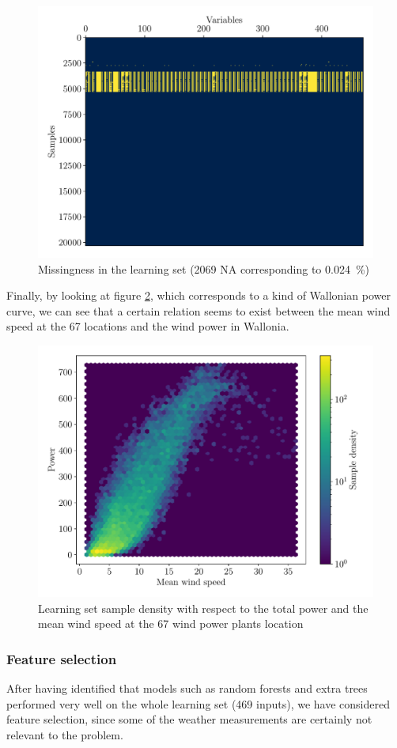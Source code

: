 \documentclass[a4paper, 12pt]{article}
\begin{document}
	\begin{figure}[H]
		\centering
		\includegraphics[width=.5\textwidth]{resources/pdf/wind_missingness.pdf}
		\vspace{-1em}
		\caption{Missingness in the learning set (2069 NA corresponding to \SI{0.024}{\percent})}
		\label{fig:wind_missingness}
	\end{figure}

	Finally, by looking at figure \ref{fig:wind_wallonia_pc}, which corresponds to a kind of Wallonian power curve, we can see that a certain relation seems to exist between the mean wind speed at the 67 locations and the wind power in Wallonia.

	\begin{figure}[H]
		\centering
		\includegraphics[width=.8\textwidth]{resources/pdf/wind_wallonia_pc.pdf}
		\vspace{-1em}
		\caption{Learning set sample density with respect to the total power and the mean wind speed at the 67 wind power plants location}
		\label{fig:wind_wallonia_pc}
	\end{figure}

	\subsubsection{Feature selection}
	After having identified that models such as random forests and extra trees performed very well on the whole learning set (469 inputs), we have considered feature selection, since some of the weather measurements are certainly not relevant to the problem.
\end{document}
